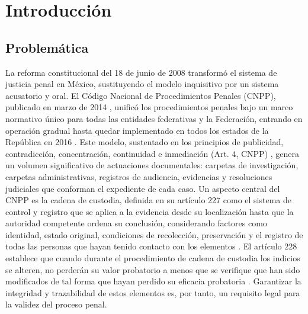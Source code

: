\chapter{Introducción}\label{cap:introduccion}

\section{Problemática}\label{sec:problematica}

La reforma constitucional del 18 de junio de 2008 transformó el sistema de justicia penal en México, sustituyendo el modelo inquisitivo por un sistema acusatorio y oral. El Código Nacional de Procedimientos Penales (CNPP), publicado en marzo de 2014 \cite{cnpp2021}, unificó los procedimientos penales bajo un marco normativo único para todas las entidades federativas y la Federación, entrando en operación gradual hasta quedar implementado en todos los estados de la República en 2016 \cite{justia2024}. Este modelo, sustentado en los principios de publicidad, contradicción, concentración, continuidad e inmediación (Art. 4, CNPP) \cite{cnpp2021}, genera un volumen significativo de actuaciones documentales: carpetas de investigación, carpetas administrativas, registros de audiencia, evidencias y resoluciones judiciales que conforman el expediente de cada caso. Un aspecto central del CNPP es la cadena de custodia, definida en su artículo 227 como el sistema de control y registro que se aplica a la evidencia desde su localización hasta que la autoridad competente ordena su conclusión, considerando factores como identidad, estado original, condiciones de recolección, preservación y el registro de todas las personas que hayan tenido contacto con los elementos \cite{cnpp2021}. El artículo 228 establece que cuando durante el procedimiento de cadena de custodia los indicios se alteren, no perderán su valor probatorio a menos que se verifique que han sido modificados de tal forma que hayan perdido su eficacia probatoria \cite{cnpp2021}. Garantizar la integridad y trazabilidad de estos elementos es, por tanto, un requisito legal para la validez del proceso penal.

